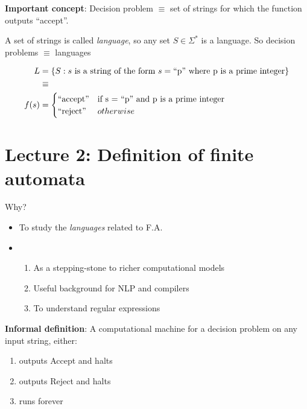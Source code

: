 \textbf{Important concept}: Decision problem $\equiv$ set of strings for which the function outputs ``accept''.

\begin{definition}
    A set of strings is called \emph{language}, so any set $S \in \Sigma^*$ is a language. So decision problems $\equiv$ languages
\end{definition}

\begin{equation*}
    \begin{aligned}
      L &= \left \{ S: s \text{ is a string of the form } s=\text{``p'' where p is a prime integer} \right \}\\
      &\equiv \\
      f(s) &=
      \begin{cases}
        \text{``accept''} & \text{if s = ``p'' and p is a prime integer} \\
        \text{``reject''} & otherwise
      \end{cases}
    \end{aligned}
\end{equation*}

\section*{Lecture 2: Definition of finite automata}

Why?

\begin{itemize}
    \item To study the \emph{languages} related to F.A.
    \item
  \begin{enumerate}
    \item As a stepping-stone to richer computational models
    \item Useful background for NLP and compilers
    \item To understand regular expressions
  \end{enumerate}
\end{itemize}

\textbf{Informal definition}: A computational machine for a decision problem on any input string, either:

\begin{enumerate}
    \item outputs Accept and halts
    \item outputs Reject and halts
    \item runs forever
\end{enumerate}

